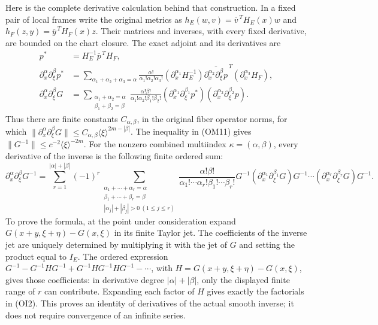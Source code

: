 \documentclass[
  11pt,
]{article}
\begin{document}
Here is the complete derivative calculation behind that construction. In
a fixed pair of local frames write the original metrics as
\(h_E(w,v)=\overline v^{\,T}H_E(x)w\) and
\(h_F(z,y)=\overline y^{\,T}H_F(x)z\). Their matrices and inverses, with
every fixed derivative, are bounded on the chart closure. The exact
adjoint and its derivatives are \[
 \begin{aligned}
 p^*&=H_E^{-1}\overline p^{\,T}H_F,\\
 \partial_x^\alpha\partial_\xi^\beta p^*
 &=\sum_{\alpha_1+\alpha_2+\alpha_3=\alpha}
   \frac{\alpha!}{\alpha_1!\alpha_2!\alpha_3!}
   (\partial_x^{\alpha_1}H_E^{-1})
   \overline{\partial_x^{\alpha_2}\partial_\xi^\beta p}^{\,T}
   (\partial_x^{\alpha_3}H_F),\\
 \partial_x^\alpha\partial_\xi^\beta G
 &=\sum_{\substack{\alpha_1+\alpha_2=\alpha\\
                   \beta_1+\beta_2=\beta}}
   \frac{\alpha!\beta!}{\alpha_1!\alpha_2!\beta_1!\beta_2!}
   (\partial_x^{\alpha_1}\partial_\xi^{\beta_1}p^*)
   (\partial_x^{\alpha_2}\partial_\xi^{\beta_2}p).
 \end{aligned}
 \tag{OI1}
\] Thus there are finite constants \(C_{\alpha,\beta}\), in the original
fiber operator norms, for which
\(\|\partial_x^\alpha\partial_\xi^\beta G\|
 \le C_{\alpha,\beta}\langle\xi\rangle^{2m-|\beta|}\). The inequality in
(OM11) gives \(\|G^{-1}\|\le c^{-2}\langle\xi\rangle^{-2m}\). For the
nonzero combined multiindex \(\kappa=(\alpha,\beta)\), every derivative
of the inverse is the following finite ordered sum: \[
 \partial_x^\alpha\partial_\xi^\beta G^{-1}
 =\sum_{r=1}^{|\alpha|+|\beta|}(-1)^r
   \sum_{\substack{\alpha_1+\cdots+\alpha_r=\alpha\\
                   \beta_1+\cdots+\beta_r=\beta\\
                   |\alpha_j|+|\beta_j|>0\ (1\le j\le r)}}
   \frac{\alpha!\beta!}
        {\alpha_1!\cdots\alpha_r!\beta_1!\cdots\beta_r!}
   G^{-1}(\partial_x^{\alpha_1}\partial_\xi^{\beta_1}G)G^{-1}
   \cdots
   (\partial_x^{\alpha_r}\partial_\xi^{\beta_r}G)G^{-1}.
 \tag{OI2}
\] To prove the formula, at the point under consideration expand
\(G(x+y,\xi+\eta)-G(x,\xi)\) in its finite Taylor jet. The coefficients
of the inverse jet are uniquely determined by multiplying it with the
jet of \(G\) and setting the product equal to \(I_E\). The ordered
expression \(G^{-1}-G^{-1}HG^{-1}+G^{-1}HG^{-1}HG^{-1}-\cdots\), with
\(H=G(x+y,\xi+\eta)-G(x,\xi)\), gives those coefficients: in derivative
degree \(|\alpha|+|\beta|\), only the displayed finite range of \(r\)
can contribute. Expanding each factor of \(H\) gives exactly the
factorials in (OI2). This proves an identity of derivatives of the
actual smooth inverse; it does not require convergence of an infinite
series.
\end{document}
